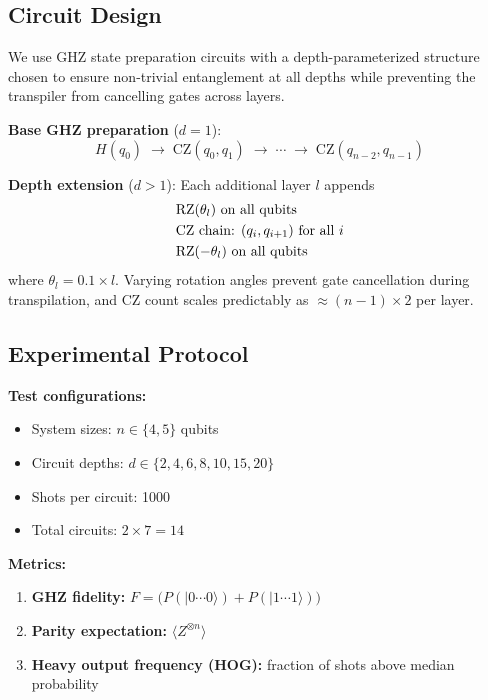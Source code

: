 \documentclass[12pt,letterpaper]{article}
\begin{document}
\subsection{Circuit Design}

We use GHZ state preparation circuits with a depth-parameterized structure chosen to
ensure non-trivial entanglement at all depths while preventing the transpiler from
cancelling gates across layers.

\textbf{Base GHZ preparation} ($d = 1$):
\begin{equation}
  H(q_0) \;\to\; \text{CZ}(q_0,q_1) \;\to\; \cdots \;\to\; \text{CZ}(q_{n-2},q_{n-1})
\end{equation}

\textbf{Depth extension} ($d > 1$): Each additional layer $l$ appends
\begin{align}
  &\text{RZ}(\theta_l) \text{ on all qubits} \notag\\
  &\text{CZ chain: } (q_i, q_{i+1}) \text{ for all } i \notag\\
  &\text{RZ}(-\theta_l) \text{ on all qubits}
\end{align}
where $\theta_l = 0.1 \times l$. Varying rotation angles prevent gate cancellation
during transpilation, and CZ count scales predictably as $\approx (n{-}1)\times 2$
per layer.

\subsection{Experimental Protocol}

\textbf{Test configurations:}
\begin{itemize}
  \item System sizes: $n \in \{4, 5\}$ qubits
  \item Circuit depths: $d \in \{2, 4, 6, 8, 10, 15, 20\}$
  \item Shots per circuit: 1000
  \item Total circuits: $2 \times 7 = 14$
\end{itemize}

\textbf{Metrics:}
\begin{enumerate}
  \item \textbf{GHZ fidelity:}
        $F = \bigl(P(|0\cdots0\rangle) + P(|1\cdots1\rangle)\bigr)$
  \item \textbf{Parity expectation:}
        $\langle Z^{\otimes n} \rangle$
  \item \textbf{Heavy output frequency (HOG):} fraction of shots above median
        probability
\end{enumerate}
\end{document}
